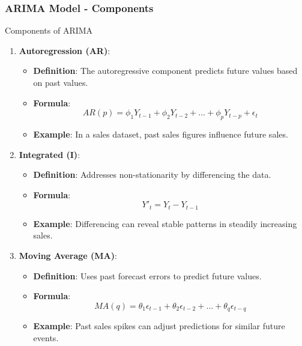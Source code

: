 \documentclass[aspectratio=169]{beamer}
\begin{document}
\begin{frame}[fragile]
    \frametitle{ARIMA Model - Components}
    \begin{block}{Components of ARIMA}
        \begin{enumerate}
            \item \textbf{Autoregression (AR)}:
                \begin{itemize}
                    \item \textbf{Definition}: The autoregressive component predicts future values based on past values.
                    \item \textbf{Formula}:
                    \begin{equation}
                    AR(p) = \phi_1 Y_{t-1} + \phi_2 Y_{t-2} + \ldots + \phi_p Y_{t-p} + \epsilon_t
                    \end{equation}
                    \item \textbf{Example}: In a sales dataset, past sales figures influence future sales.
                \end{itemize}

            \item \textbf{Integrated (I)}:
                \begin{itemize}
                    \item \textbf{Definition}: Addresses non-stationarity by differencing the data.
                    \item \textbf{Formula}:
                    \begin{equation}
                    Y'_t = Y_t - Y_{t-1}
                    \end{equation}
                    \item \textbf{Example}: Differencing can reveal stable patterns in steadily increasing sales.
                \end{itemize}

            \item \textbf{Moving Average (MA)}:
                \begin{itemize}
                    \item \textbf{Definition}: Uses past forecast errors to predict future values.
                    \item \textbf{Formula}:
                    \begin{equation}
                    MA(q) = \theta_1 \epsilon_{t-1} + \theta_2 \epsilon_{t-2} + \ldots + \theta_q \epsilon_{t-q}
                    \end{equation}
                    \item \textbf{Example}: Past sales spikes can adjust predictions for similar future events.
                \end{itemize}
        \end{enumerate}
    \end{block}
\end{frame}
\end{document}
